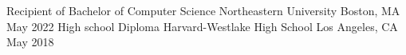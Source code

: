 

\begin{cventries}

  \cventry
    {Recipient of Bachelor of Computer Science} %
    {Northeastern University} %
    {Boston, MA} %
    {May 2022} %
    {
    }
    \vspace{-0.2cm}
    \cventry
    {High school Diploma} %
    {Harvard-Westlake High School} %
    {Los Angeles, CA} %
    {May 2018} %
    {
    }
\vspace{-0.9cm}
\end{cventries}
